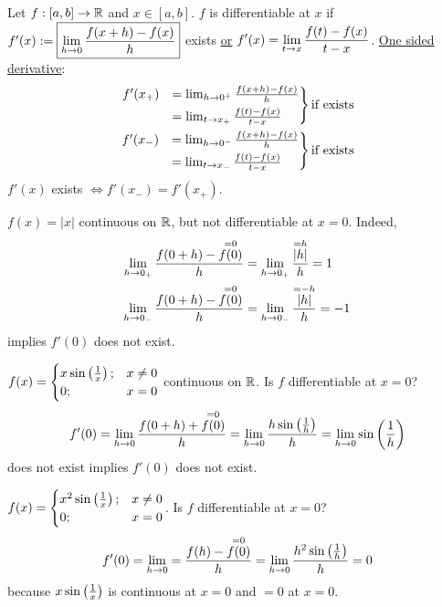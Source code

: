 \documentclass[]{article}
\begin{document}
\begin{definition}
	Let $f:[a,b]\rightarrow\mathbb{R}$ and $x\in[a,b]$.
	$f$ is differentiable at $x$ if $f'(x):=\fbox{$\displaystyle\lim_{h\rightarrow0} \frac{f(x+h)-f(x)}h$}$ exists \ul{\ul{or}} $\displaystyle f'(x) = \lim_{t\rightarrow x}\frac{f(t)-f(x)}{t-x}$.
\ul{One sided derivative}:
\begin{align*}
	\begin{rcases} f'(x_+) &= \lim_{h\rightarrow0^+} \frac{f(x+h)-f(x)}h \\ &= \lim_{t\rightarrow x_+} \frac{f(t)-f(x)}{t-x} \end{rcases} \text{if exists} \\
	\begin{rcases} f'(x_-) &= \lim_{h\rightarrow0^-} \frac{f(x+h)-f(x)}h \\ &= \lim_{t\rightarrow x_-} \frac{f(t)-f(x)}{t-x} \end{rcases} \text{if exists}
\end{align*}
$f'(x)$ exists $\iff f'(x_-)=f'(x_+)$.
\end{definition}
\begin{example}
	$f(x) = |x|$ continuous on $\mathbb{R}$, but not differentiable at $x=0$.
	Indeed,
	\begin{align*}
		\lim_{h\rightarrow0_+} \frac{f(0+h)-\overset{=0}{f(0)}}h &= \lim_{h\rightarrow0_+} \frac{\overset{=h}{|h|}}h=1 \\
		\lim_{h\rightarrow0_-} \frac{f(0+h)-\overset{=0}{f(0)}}h &= \lim_{h\rightarrow0_-} \frac{\overset{=-h}{|h|}}h=-1
	\end{align*}
	implies $f'(0)$ does not exist.
\end{example}
\begin{example}
	$f(x) = \begin{cases} x\sin\left(\frac1x\right); & x\neq 0 \\ 0; & x=0 \end{cases}$ continuous on $\mathbb{R}$.
	Is $f$ differentiable at $x=0$?
	$$f'(0) = \lim_{h\rightarrow0}\frac{f(0+h)+\overset{=0}{f(0)}}h = \lim_{h\rightarrow0} \frac{h\sin\left(\frac1h\right)}h = \lim_{h\rightarrow0}\sin\left(\frac1h\right)$$
	does not exist implies $f'(0)$ does not exist.
	\label{ex-5-1}
\end{example}
\begin{example}
	$f(x) = \begin{cases} x^2\sin\left(\frac1x\right); & x\neq0 \\ 0; & x=0 \end{cases}$.
	Is $f$ differentiable at $x=0$?
	$$f'(0) = \lim_{h\rightarrow0} = \frac{f(h)-\overset{=0}{f(0)}}h = \lim_{h\rightarrow0} \frac{h^2\sin\left(\frac1h\right)}h = 0$$
	because $x\sin\left(\frac1x\right)$ is continuous at $x=0$ and $=0$ at $x=0$.
	\label{ex-5-2}
\end{example}
\end{document}
